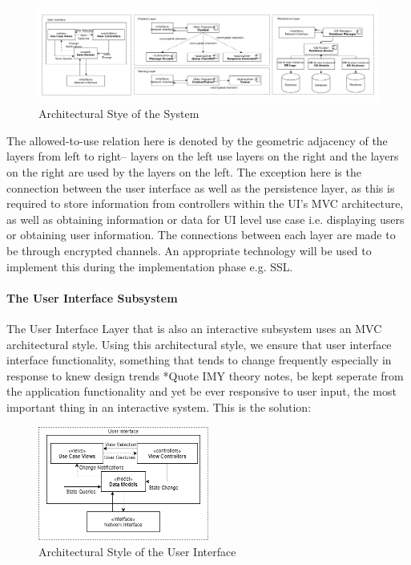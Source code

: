 \documentclass[11pt]{article}
\begin{document}
\begin{figure}[H]
	\centering
	\hspace*{-2.1cm}\includegraphics[width=1.25\textwidth]{../../images/Botic_Layered_Architecture.png}
	\caption{Architectural Stye of the System}
\end{figure}

The allowed-to-use relation here is denoted by the geometric adjacency of the layers from left to right-- layers on the left use layers on the right and the layers on the right are used by the layers on the left. The exception here is the connection between the user interface as well as the persistence layer, as this is required to store information from controllers within the UI's MVC architecture, as well as obtaining information or data for UI level use case i.e. displaying users or obtaining user information. The connections between each layer are made to be through encrypted channels. An appropriate technology will be used to implement this during the implementation phase e.g. SSL.

\paragraph{The User Interface Subsystem}
The User Interface Layer that is also an interactive subsystem uses an MVC architectural style. Using this architectural style, we ensure that user interface interface functionality, something that tends to change frequently especially in response to knew design trends *Quote IMY theory notes, be kept seperate from the application functionality and yet be ever responsive to user input, the most important thing in an interactive system\cite{Book:2}. This is the solution:

\begin{figure}[H]
	\centering
	\includegraphics[width=0.5\textwidth]{../../images/User_Interface_MVC.png}
	\caption{Architectural Style of the User Interface}
\end{figure}
\end{document}

